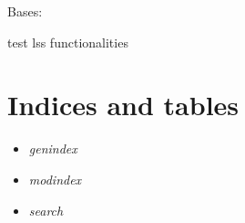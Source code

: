 \documentclass[letterpaper,10pt,english]{sphinxmanual}
\begin{document}
\begin{fulllineitems}
\label{tests:tests.testLss}
Bases: 

test lss functionalities

\begin{fulllineitems}
\label{tests:tests.testLss.testIdentity}
\end{fulllineitems}


\begin{fulllineitems}
\label{tests:tests.testLss.test_abcd_normalize}
\end{fulllineitems}


\begin{fulllineitems}
\label{tests:tests.testLss.test_f}
\end{fulllineitems}


\begin{fulllineitems}
\label{tests:tests.testLss.test_zero_control}
\end{fulllineitems}


\end{fulllineitems}



\chapter{Indices and tables}
\label{index:indices-and-tables}\begin{itemize}
\item {} 
\emph{genindex}

\item {} 
\emph{modindex}

\item {} 
\emph{search}

\end{itemize}
\end{document}
